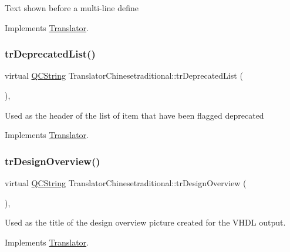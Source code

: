 Text shown before a multi-\/line define 

Implements \mbox{\hyperlink{class_translator}{Translator}}.

\mbox{\label{class_translator_chinesetraditional_a028e21ebc33dffcd502982aa7fa64503}} 
\subsubsection{\texorpdfstring{trDeprecatedList()}{trDeprecatedList()}}
{\footnotesize\ttfamily virtual \mbox{\hyperlink{class_q_c_string}{Q\+C\+String}} Translator\+Chinesetraditional\+::tr\+Deprecated\+List (\begin{DoxyParamCaption}{ }\end{DoxyParamCaption})\hspace{0.3cm}{\ttfamily [inline]}, {\ttfamily [virtual]}}

Used as the header of the list of item that have been flagged deprecated 

Implements \mbox{\hyperlink{class_translator}{Translator}}.

\mbox{\label{class_translator_chinesetraditional_a28a04fe5921fbe1690c31a043538b588}} 
\subsubsection{\texorpdfstring{trDesignOverview()}{trDesignOverview()}}
{\footnotesize\ttfamily virtual \mbox{\hyperlink{class_q_c_string}{Q\+C\+String}} Translator\+Chinesetraditional\+::tr\+Design\+Overview (\begin{DoxyParamCaption}{ }\end{DoxyParamCaption})\hspace{0.3cm}{\ttfamily [inline]}, {\ttfamily [virtual]}}

Used as the title of the design overview picture created for the V\+H\+DL output. 

Implements \mbox{\hyperlink{class_translator}{Translator}}.

